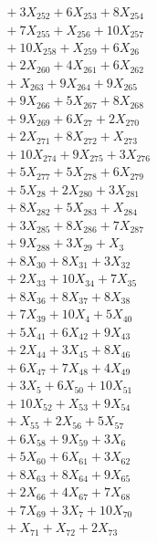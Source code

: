\documentclass[a4paper,10pt]{article}
\begin{document}
{\begin{align}
&\quad  + 3X_{252} + 6X_{253} + 8X_{254} \\[0.5ex]
&\quad  + 7X_{255} + X_{256} + 10X_{257} \\[0.5ex]
&\quad  + 10X_{258} + X_{259} + 6X_{26} \\[0.5ex]
&\quad  + 2X_{260} + 4X_{261} + 6X_{262} \\[0.5ex]
&\quad  + X_{263} + 9X_{264} + 9X_{265} \\[0.5ex]
&\quad  + 9X_{266} + 5X_{267} + 8X_{268} \\[0.5ex]
&\quad  + 9X_{269} + 6X_{27} + 2X_{270} \\[0.5ex]
&\quad  + 2X_{271} + 8X_{272} + X_{273} \\[0.5ex]
&\quad  + 10X_{274} + 9X_{275} + 3X_{276} \\[0.5ex]
&\quad  + 5X_{277} + 5X_{278} + 6X_{279} \\[0.5ex]
&\quad  + 5X_{28} + 2X_{280} + 3X_{281} \\[0.5ex]
&\quad  + 8X_{282} + 5X_{283} + X_{284} \\[0.5ex]
&\quad  + 3X_{285} + 8X_{286} + 7X_{287} \\[0.5ex]
&\quad  + 9X_{288} + 3X_{29} + X_{3} \\[0.5ex]
&\quad  + 8X_{30} + 8X_{31} + 3X_{32} \\[0.5ex]
&\quad  + 2X_{33} + 10X_{34} + 7X_{35} \\[0.5ex]
&\quad  + 8X_{36} + 8X_{37} + 8X_{38} \\[0.5ex]
&\quad  + 7X_{39} + 10X_{4} + 5X_{40} \\[0.5ex]
&\quad  + 5X_{41} + 6X_{42} + 9X_{43} \\[0.5ex]
&\quad  + 2X_{44} + 3X_{45} + 8X_{46} \\[0.5ex]
&\quad  + 6X_{47} + 7X_{48} + 4X_{49} \\[0.5ex]
&\quad  + 3X_{5} + 6X_{50} + 10X_{51} \\[0.5ex]
&\quad  + 10X_{52} + X_{53} + 9X_{54} \\[0.5ex]
&\quad  + X_{55} + 2X_{56} + 5X_{57} \\[0.5ex]
&\quad  + 6X_{58} + 9X_{59} + 3X_{6} \\[0.5ex]
&\quad  + 5X_{60} + 6X_{61} + 3X_{62} \\[0.5ex]
&\quad  + 8X_{63} + 8X_{64} + 9X_{65} \\[0.5ex]
&\quad  + 2X_{66} + 4X_{67} + 7X_{68} \\[0.5ex]
&\quad  + 7X_{69} + 3X_{7} + 10X_{70} \\[0.5ex]
&\quad  + X_{71} + X_{72} + 2X_{73} \\[0.5ex]

\end{align}}
\end{document}
